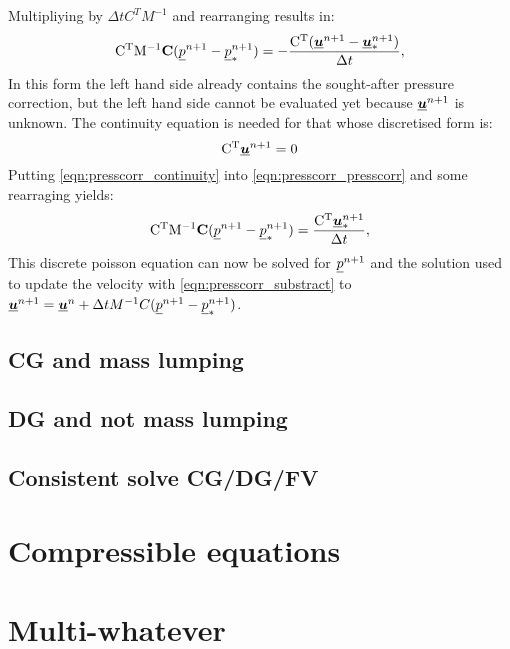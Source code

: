 Multipliying by $\Delta t C^TM^{-1}$ and rearranging results in:
\begin{equation}\label{eqn:presscorr_presscorr}
\mathrm{C^T} \mathrm{M^{-1}}{\mbox{\boldmath$\mathrm{C}$}} ( \underline{p}^{n+1} -  \underline{p}_*^{    n+1})
=-\frac{\mathrm{C^T}  ({\underline{{\mbox{\boldmath$u$}}}^{n+1}-\underline{{\mbox{\boldmath$u$}}}_*^{n+1}})}{\Delta t},
\end{equation}
In this form the left hand side already contains the sought-after pressure correction, but the left hand side cannot be evaluated yet because $\underline{{\mbox{\boldmath$u$}}}^{n+1}$ is unknown. The continuity equation is needed for that whose discretised form is:
\begin{equation}\label{eqn:presscorr_continuity}
\mathrm{C^T} \underline{{\mbox{\boldmath$u$}}}^{n+1}=0
\end{equation}
Putting \eqref{eqn:presscorr_continuity} into \eqref{eqn:presscorr_presscorr} and some rearraging yields:
\begin{equation*}
 \mathrm{C^T} \mathrm{M^{-1}}{\mbox{\boldmath$\mathrm{C}$}} ( \underline{p}^{n+1} -  \underline{p}_*^{    n+1})
=\frac{ \mathrm{C^T} \underline{{\mbox{\boldmath$u$}}}_*^{n+1}}{\Delta t},
\end{equation*}
This discrete poisson equation can now be solved for $\underline{p}^{n+1}$ and the solution used to update the velocity with \eqref{eqn:presscorr_substract} to $\underline{{\mbox{\boldmath$u$}}}^{n+1}=\underline{{\mbox{\boldmath$u$}}}^{n}+\Delta t  M^{-1} C ( \underline{p}^{n+1} - \underline{p}_*^{n+1})$.


\subsection{CG and mass lumping}
\label{Sect:ND_cg_mass_lumping}


\subsection{DG and not mass lumping}

\subsection{Consistent solve CG/DG/FV}

\section{Compressible equations}

\section{Multi-whatever}

